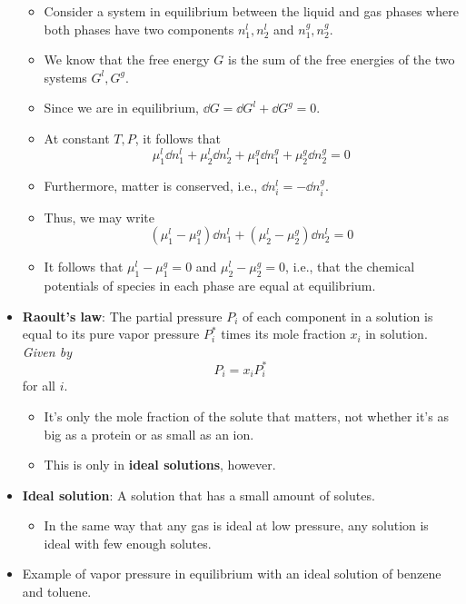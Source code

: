 \documentclass[../notes.tex]{subfiles}
\begin{document}
\begin{itemize}
\begin{itemize}
        \item Consider a system in equilibrium between the liquid and gas phases where both phases have two components $n_1^l,n_2^l$ and $n_1^g,n_2^g$.
        \item We know that the free energy $G$ is the sum of the free energies of the two systems $G^l,G^g$.
        \item Since we are in equilibrium, $\dd{G}=\dd{G^l}+\dd{G^g}=0$.
        \item At constant $T,P$, it follows that
        \begin{equation*}
            \mu_1^l\dd{n_1^l}+\mu_2^l\dd{n_2^l}+\mu_1^g\dd{n_1^g}+\mu_2^g\dd{n_2^g} = 0
        \end{equation*}
        \item Furthermore, matter is conserved, i.e., $\dd{n_i^l}=-\dd{n_i^g}$.
        \item Thus, we may write
        \begin{equation*}
            (\mu_1^l-\mu_1^g)\dd{n_1^l}+(\mu_2^l-\mu_2^g)\dd{n_2^l} = 0
        \end{equation*}
        \item It follows that $\mu_1^l-\mu_1^g=0$ and $\mu_2^l-\mu_2^g=0$, i.e., that the chemical potentials of species in each phase are equal at equilibrium.
    \end{itemize}
    \item \textbf{Raoult's law}: The partial pressure $P_i$ of each component in a solution is equal to its pure vapor pressure $P_i^*$ times its mole fraction $x_i$ in solution. \emph{Given by}
    \begin{equation*}
        P_i = x_iP_i^*
    \end{equation*}
    for all $i$.
    \begin{itemize}
        \item It's only the mole fraction of the solute that matters, not whether it's as big as a protein or as small as an ion.
        \item This is only in \textbf{ideal solutions}, however.
    \end{itemize}
    \item \textbf{Ideal solution}: A solution that has a small amount of solutes.
    \begin{itemize}
        \item In the same way that any gas is ideal at low pressure, any solution is ideal with few enough solutes.
    \end{itemize}
    \item Example of vapor pressure in equilibrium with an ideal solution of benzene and toluene.
    \begin{figure}[h!]
        \centering
\end{figure}
\end{itemize}
\end{document}
